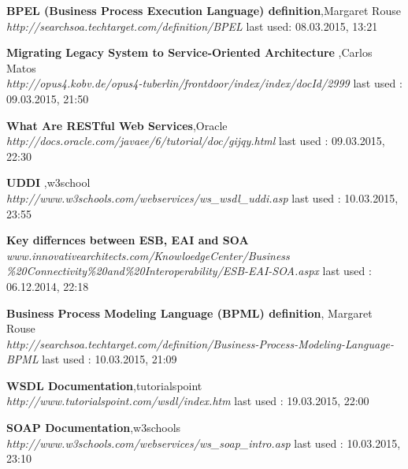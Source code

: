\documentclass[12pt]{article}
\begin{document}
\begin{thebibliography}{56}
     


   \textbf{BPEL (Business Process Execution Language) definition},Margaret Rouse \\
  \textit{http://searchsoa.techtarget.com/definition/BPEL}
  \newline last used: 08.03.2015, 13:21

    \textbf{Migrating Legacy System to Service-Oriented Architecture },Carlos Matos\\
    \textit{http://opus4.kobv.de/opus4-tuberlin/frontdoor/index/index/docId/2999}
    \newline last used : 09.03.2015, 21:50

    \textbf{What Are RESTful Web Services},Oracle \\
    \textit{http://docs.oracle.com/javaee/6/tutorial/doc/gijqy.html}
    \newline last used : 09.03.2015, 22:30

    \textbf{UDDI },w3school\\
    \textit{http://www.w3schools.com/webservices/ws\_wsdl\_uddi.asp}
    \newline last used : 10.03.2015, 23:55

  


   \textbf{Key differnces between ESB, EAI and SOA}\\
  \textit{www.innovativearchitects.com/KnowloedgeCenter/Business \\ \%20Connectivity\%20and\%20Interoperability/ESB-EAI-SOA.aspx}
  \newline last used : 06.12.2014, 22:18



 	
   	  
   \textbf{Business Process Modeling Language (BPML) definition}, Margaret Rouse\\
  \textit{http://searchsoa.techtarget.com/definition/Business-Process-Modeling-Language-BPML}
  \newline last used : 10.03.2015, 21:09

   	\textbf{WSDL Documentation},tutorialspoint \\
    \textit{http://www.tutorialspoint.com/wsdl/index.htm}
    \newline last used : 19.03.2015, 22:00

	\textbf{SOAP Documentation},w3schools \\
    \textit{http://www.w3schools.com/webservices/ws\_soap\_intro.asp}
    \newline last used : 10.03.2015, 23:10  
   	 

\end{thebibliography}
\end{document}
